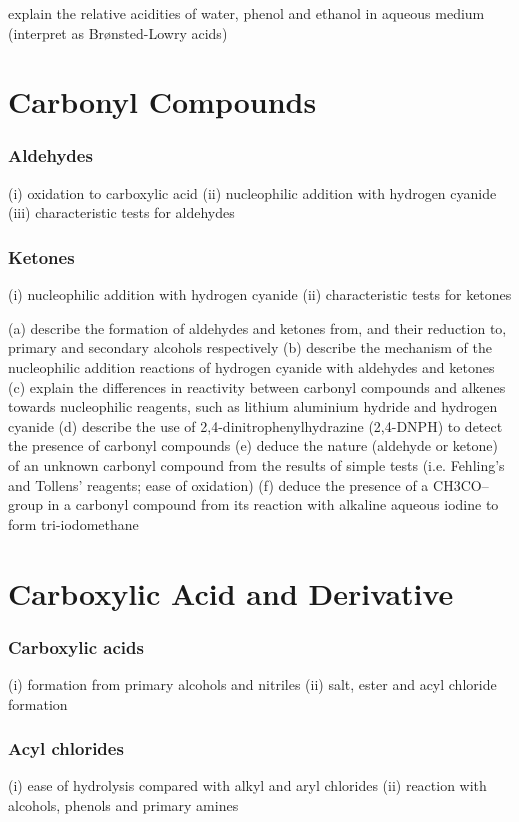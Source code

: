 \documentclass[12pt,a4 paper]{article}
\begin{document}
explain the relative acidities of water, phenol and ethanol in aqueous medium (interpret as Brønsted-Lowry acids)
\pagebreak

\part{Carbonyl Compounds}
\section{Aldehydes}
(i) oxidation to carboxylic acid
(ii) nucleophilic addition with hydrogen cyanide
(iii) characteristic tests for aldehydes
\pagebreak

\section{Ketones}
(i) nucleophilic addition with hydrogen cyanide
(ii) characteristic tests for ketones

(a) describe the formation of aldehydes and ketones from, and their reduction to, primary and secondary
alcohols respectively
(b) describe the mechanism of the nucleophilic addition reactions of hydrogen cyanide with aldehydes and
ketones
(c) explain the differences in reactivity between carbonyl compounds and alkenes towards nucleophilic
reagents, such as lithium aluminium hydride and hydrogen cyanide
(d) describe the use of 2,4-dinitrophenylhydrazine (2,4-DNPH) to detect the presence of carbonyl compounds
(e) deduce the nature (aldehyde or ketone) of an unknown carbonyl compound from the results of simple tests
(i.e. Fehling’s and Tollens’ reagents; ease of oxidation)
(f) deduce the presence of a CH3CO– group in a carbonyl compound from its reaction with alkaline aqueous iodine to form tri-iodomethane
\pagebreak

\part{Carboxylic Acid and Derivative}
\section{Carboxylic acids}
(i) formation from primary alcohols and nitriles
(ii) salt, ester and acyl chloride formation
\pagebreak

\section{Acyl chlorides}
(i) ease of hydrolysis compared with alkyl and aryl chlorides
(ii) reaction with alcohols, phenols and primary amines
\pagebreak
\end{document}
